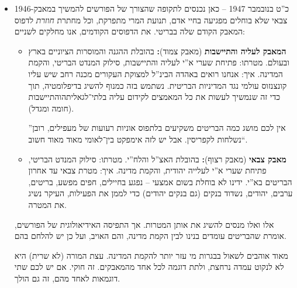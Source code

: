 \documentclass[]{../../../../tex/classes/styledArticle}
\begin{document}
\begin{itemize}
		סיבות לפירוק תנועת המרי: 
		\begin{itemize}
			\item כל הדברים לעיל הובילו ל''מבצע ברוסיד``. במסגרתו התרחש האירוע הראשון שהוביל לפירוק תנועת המרי – ''השבת השחורה``. שלושת אלפים (מתוך כמה מאות אלפים בכל היישוב היהודי) נעצרו, המוני מסמכים נאספו, וכמויות נשק הוחרמו. כבר בנקודת הזמן הזו, מתגבשת ההבנה בהגנה שפעילות צבאית נגד בריטניה לא משיגה את מטרותיה. 
			\item פיצוץ מלון המלך דוד: במשך שנים האצ''ל טען בתוקף שהיה לו אישור מועדת X. עוד לטענת האצ''ל הם התריאו. רק אחרי מלחמת ששת הימים תוקן החלק הדרום מערבי של המלון. 
			
			השורה התחתונה, היא שבעולם הפיצוץ מתפרש כפיגוע טרור. היישוב היהודי ומוסדות ההסתדרות הציונית מתנערים מהאירוע הזה. לימים, הסתבר שאכן קיבלו אישור מועדת X (\textit{הערה שלי: זה אי־דיוק. האישור התקבל לפיצוץ בתנאים אחרים}). 
		\end{itemize}
		
		בבגרות עדיף לכתוב קודם על השבת השחורה ואז על מלון המלך דוד. 
		\item 1946-כ''ט בנובמבר 1947 --
		כאן נכנסים לתקופה שהצורך של הפורשים להמשיך במאבק צבאי שלא בוחלים מפגיעה בחיי אדם, תנועת המרי מתפרקת, וכל מחתרת \textit{חוזרת} לדפוס המאבק הקודם שלה בבריטי. את הדפוסים הקודמים, אנו מחלקים לשניים: 
		\begin{itemize}
			\item \textbf{המאבק לעליה והתיישבות} (מאבק צמוד)\textbf{: }בהובלת ההגנה והמוסרות הציוניים בארץ ובעולם. מטרתו: פתיחת שערי א''י לעליה והתיישבות, סילוק המנדט הבריטי, והקמת המדינה. איך: אנחנו רואים באהדה הבינ''ל למצוקת העקורים מכנה רחב שיש עליו קונצנזוס עולמי נגד המדיניות הבריטית. נשתמש בזה כמנוף להשיג בדיפלומטיה, תוך כדי זה שנמשיך לעשות את כל המאמצים לקידום עליה בלתי־לגאליתהוהתיישבות (חומה ומגדל). 
			
			''אין לכם מושג כמה הבריטים משקיעים בלתפוס אוניות רעועות של מעפילים, רובן נשלחות לקפריסין. אבל יש לזה אימפקט בין־לאומי מאוד מאוד חשוב``. 
			\item \textbf{מאבק צבאי} (מאבק רצוף)\textbf{: }בהובלת האצ''ל והלח''י. מטרתו: סילוק המנדט הבריטי, פתיחת שערי א''י לעלייה יהודית, והקמת מדינה. איך: מטרת צבאי עד אחרון הבריטים בא''י. ידינו לא בוחלת בשום אמצעי – נפגע בחיילים, חפים מפשע, בריטים, ערבים, יהודים, נשדוד בנקים (גם בנקים יהודים) כדי לממן את הפעילות, העיקר נשיג את המטרה. 
		\end{itemize}
		אלו ואלו מנסים להשיג את אותן המטרות. אך התפיסה האידיאולוגית של הפורשים, אומרת שהבריטים עומדים בנינו לבין הקמת מדינה, והם האויב, ועל כן יש להלחם בהם. 
		
		מאוד אוהבים לשאול בבגרות מי עזר יותר להקמת המדינה. עצת המורה (לא שרית) היא לא לנקוט עמדה נרחצת, ולתת דוגמה לכל אחד מהמאבקים. זה חוקי. אם יש לכם שתי דוגמאות לאחד מהם, זה גם הולך. 
	\end{itemize}
	
	
	
	
	\ndoc
\end{document}
